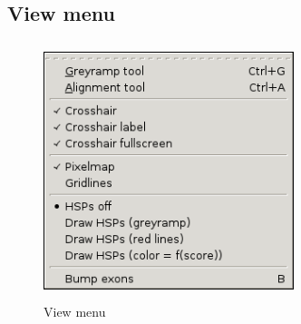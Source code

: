 \documentclass[letterpaper]{article}
\begin{document}
{ \color[rgb]{0.30980393,0.5058824,0.7411765}\subsection[View menu]{View menu}}

\begin{figure}
 \centering
 \color[rgb]{0.30980393,0.5058824,0.7411765}
 \includegraphics[width=7.303cm,height=7.454cm]{img_menu_view.png}
 \caption{View menu}
\end{figure}
\end{document}
